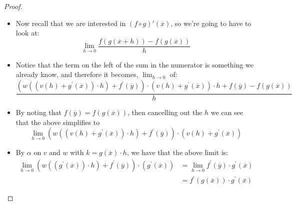 \begin{proof}
\begin{itemize}
\begin{align*}
{                \prime } \left( \overline{x}  \right)  \right) \cdot h  \right)
                \\
                &= \left( w\left( \left(    v\left( h \right) +  g ^{ \prime }
                \left( \overline{x}  \right)  \right) \cdot h \right) +  f ^{
                \prime } \left( \overline{y}  \right)  \right) \cdot \left(
                v\left( h \right) +  g ^{ \prime } \left( \overline{x}  \right)
                \right) \cdot h \\
                &+  f\left( \overline{y}  \right)
            \end{align*}
        \item Now recall that we are interested in $ \left( f \circ g \right)'
            \left( \overline{x}  \right) $, so we're going to have to look at:
            \[
            \lim_{ h \to 0 } \frac{f\left( g\left( \overline{x} +  h \right)
            \right)-  f\left( g\left( \overline{x}  \right)  \right)   }{h}
            \]
        \item Notice that the term on the left of the sum in the numerator is
            something we already know, and therefore it becomes, $ \lim_{ h \to
            0}  $ of:
        \[
        \frac{\left( w\left( \left(    v\left( h \right) +  g
        ^{ \prime } \left( \overline{x}  \right)  \right) \cdot h \right) +  f
^{ \prime } \left( \overline{y}  \right)  \right) \cdot \left(    v\left( h
\right) +  g ^{ \prime } \left( \overline{x}  \right)  \right) \cdot h +
f\left( \overline{y}  \right)-  f\left( g\left( \overline{x}  \right)  \right)
}{h}
        \]
        \item By noting that $ f\left( \overline{y}  \right) = f\left( g\left(
            \overline{x}  \right)  \right)  $, then cancelling out the $ h $ we
            can see that the above simplifies to 
        \[
        \lim_{ h \to 0 } \left( w\left( \left(    v\left( h \right) +  g ^{
        \prime } \left( \overline{x}  \right)  \right) \cdot h \right) +  f ^{
\prime } \left( \overline{y}  \right)  \right) \cdot \left(    v\left( h \right)
+  g ^{ \prime } \left( \overline{x}  \right)  \right) 
        \]
        \item By $ \alpha  $ on $ v $ and $ w $ with $ k =  g\left( \overline{x}
            \right) \cdot h  $, we have that the above limit is:
        \begin{align*}
            \lim_{ h \to 0 } \left( w\left( \left( g ^{ \prime } \left(
            \overline{x} \right)  \right) \cdot h \right) +  f ^{ \prime }
            \left( \overline{y} \right)  \right) \cdot \left(     g ^{ \prime }
            \left( \overline{x}  \right) \right)  &=  \lim_{ h \to 0 } f ^{
            \prime } \left( \overline{y}  \right) \cdot g ^{ \prime } \left(
            \overline{x}  \right) \\
            &= \boxed{ f ^{  \prime } \left( g\left( \overline{x}  \right)
            \right)  \cdot  g ^{ \prime } \left( \overline{x} \right) }
        \end{align*}
    \end{itemize}
\end{proof}

